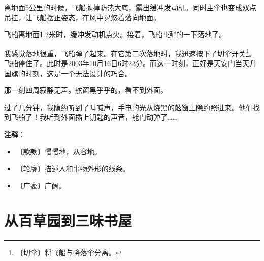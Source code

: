 \documentclass[12pt,UTF-8,openany]{ctexbook}
\begin{document}
\begin{normalsize}
    离地面5公里的时候，飞船抛掉防热大底，露出缓冲发动机。同时主伞也变成双点吊挂，让飞船摆正姿态，在风中晃悠着落向地面。
    
    飞船离地面1.2米时，缓冲发动机点火。接着，飞船“嗵”的一下落地了。
    
    我感觉落地很重，飞船弹了起来。在它第二次落地时，我迅速按下了切伞开关\footnote{〔切伞〕将飞船与降落伞分离。}。飞船停住了。此时是2003年10月16日6时23分。而这一时刻，正好是天安门当天升国旗的时刻，这是一个无法设计的巧合。
    
    那一刻四周寂静无声。舷窗黑乎乎的，看不到外面。
    
    过了几分钟，我隐约听到了叫喊声，手电的光从烧黑的舷窗上隐约照进来。他们找到飞船了！我听到外面插上钥匙的声音，舱门动弹了……
    
\end{normalsize}


\newpage

\textbf{注释}：

\vspace{-1em}

\begin{itemize}
    \setlength\itemsep{-0.2em}
    \item 〔款款〕慢慢地，从容地。
    \item 〔轮廓〕描述人和事物外形的线条。
    \item 〔广袤〕广阔。
\end{itemize}

\chapter{从百草园到三味书屋}
\end{document}
